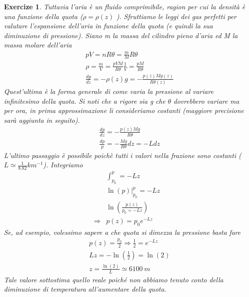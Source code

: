\documentclass[10pt,a4paper]{article}
\newtheorem{exercize}{Exercize}
\begin{document}
\begin{exercize}
Tuttavia l'aria è un fluido comprimibile, ragion per cui la densità è una funzione della quota ($\rho = \rho(z)$ ). Sfruttiamo le leggi dei gas perfetti per valutare l'espansione dell'aria in funzione della quota (e quindi la sua diminuzione di pressione). Siano m la massa del cilindro pieno d'aria ed M la massa molare dell'aria
\begin{align*}
	&p V = n R \theta = \frac{m}{M} R \theta \\
	&\rho = \frac{m}{V} = \frac{p V M}{R \theta} \frac{1}{V} = \frac{p M}{R \theta}\\
	&\frac{dp}{dz}=-\rho(z) g = - \frac{p(z) M g(z)}{R\theta(z)}
\end{align*}
Quest'ultima è la forma generale di come varia la pressione al variare infinitesimo della quota. Si noti che a rigore sia g che $\theta$ dovrebbero variare ma per ora, in prima approssimazione li consideriamo costanti (maggiore precisione sarà aggiunta in seguito). 
\begin{align*}
	&\frac{dp}{dz}=- \frac{p(z) M g}{R\theta}\\
	&\frac{dp}{p} = -\frac{M g}{R \theta} dz = - L dz
\end{align*}
L'ultimo passaggio è possibile poichè tutti i valori nella frazione sono costanti ($ L \simeq \frac{1}{8.82} km^{-1}$). Integriamo
\begin{align*}
	&\int_{p_0}^{p} = -L z\\
	& \ln(p) \Big|_{p_0}^p = -L z\\
	&\ln\left(\frac{p(z)}{p_0= - L z}\right)\\
	\Rightarrow& p(z) = p_0 e^{-L z}
\end{align*}
Se, ad esempio, volessimo sapere a che quota si dimezza la pressione basta fare
\begin{align*}
	&p(z) = \frac{p_0}{2} \Rightarrow \frac{1}{2} = e^{-L z}\\
	&L z = -\ln(\frac{1}{2}) = \ln(2) \\
	&z = \frac{\ln(2)}{L} \simeq 6100\ m
\end{align*}
Tale valore sottostima quello reale poiché non abbiamo tenuto conto della diminuzione di temperatura all'aumentare della quota.
\end{exercize}
\end{document}
